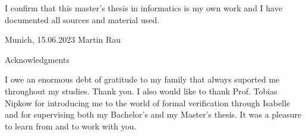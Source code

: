 \documentclass[headsepline,footsepline,footinclude=false,oneside,fontsize=11pt,paper=a4,listof=totoc,bibliography=totoc]{scrbook} %
\newcommand*{\getAuthor}{Martin Rau}
\newcommand*{\getDoctype}{Master's Thesis in Informatics}
\newcommand*{\getSubmissionDate}{15.06.2023}
\newcommand*{\getSubmissionLocation}{Munich}
\begin{document}
\thispagestyle{empty}
\vspace*{0.8\textheight}
\noindent
I confirm that this \MakeLowercase{\getDoctype{}} is my own work and I have documented all sources and material used.

\vspace{15mm}
\noindent
\getSubmissionLocation{}, \getSubmissionDate{} \hspace{50mm} \getAuthor{}

\cleardoublepage{}


%
\thispagestyle{empty}

\vspace*{20mm}

\begin{center}
{ Acknowledgments}
\end{center}

\vspace{10mm}

I owe an enormous debt of gratitude to my family that always suported me throughout my studies.
Thank you. I also would like to thank Prof. Tobias Nipkow for introducing me to the world of formal
verification through Isabelle and for supervising both my Bachelor's and my Master's thesis. It was
a pleasure to learn from and to work with you.

\cleardoublepage{}


\chapter{\abstractname}
\end{document}
